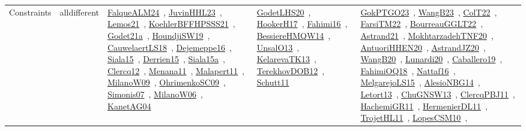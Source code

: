 {\begin{longtable}{lp{3cm}>{\raggedright\arraybackslash}p{6cm}>{\raggedright\arraybackslash}p{6cm}>{\raggedright\arraybackslash}p{8cm}}
Constraints & alldifferent & \href{../works/FalqueALM24.pdf}{FalqueALM24}~\cite{FalqueALM24}, \href{../works/JuvinHHL23.pdf}{JuvinHHL23}~\cite{JuvinHHL23}, \href{../works/Lemos21.pdf}{Lemos21}~\cite{Lemos21}, \href{../works/KoehlerBFFHPSSS21.pdf}{KoehlerBFFHPSSS21}~\cite{KoehlerBFFHPSSS21}, \href{../works/Godet21a.pdf}{Godet21a}~\cite{Godet21a}, \href{../works/HoundjiSW19.pdf}{HoundjiSW19}~\cite{HoundjiSW19}, \href{../works/CauwelaertLS18.pdf}{CauwelaertLS18}~\cite{CauwelaertLS18}, \href{../works/Dejemeppe16.pdf}{Dejemeppe16}~\cite{Dejemeppe16}, \href{../works/Siala15.pdf}{Siala15}~\cite{Siala15}, \href{../works/Derrien15.pdf}{Derrien15}~\cite{Derrien15}, \href{../works/Siala15a.pdf}{Siala15a}~\cite{Siala15a}, \href{../works/Clercq12.pdf}{Clercq12}~\cite{Clercq12}, \href{../works/Menana11.pdf}{Menana11}~\cite{Menana11}, \href{../works/Malapert11.pdf}{Malapert11}~\cite{Malapert11}, \href{../works/MilanoW09.pdf}{MilanoW09}~\cite{MilanoW09}, \href{../works/OhrimenkoSC09.pdf}{OhrimenkoSC09}~\cite{OhrimenkoSC09}, \href{../works/Simonis07.pdf}{Simonis07}~\cite{Simonis07}, \href{../works/MilanoW06.pdf}{MilanoW06}~\cite{MilanoW06}, \href{../works/KanetAG04.pdf}{KanetAG04}~\cite{KanetAG04} & \href{../works/GodetLHS20.pdf}{GodetLHS20}~\cite{GodetLHS20}, \href{../works/HookerH17.pdf}{HookerH17}~\cite{HookerH17}, \href{../works/Fahimi16.pdf}{Fahimi16}~\cite{Fahimi16}, \href{../works/BessiereHMQW14.pdf}{BessiereHMQW14}~\cite{BessiereHMQW14}, \href{../works/UnsalO13.pdf}{UnsalO13}~\cite{UnsalO13}, \href{../works/KelarevaTK13.pdf}{KelarevaTK13}~\cite{KelarevaTK13}, \href{../works/TerekhovDOB12.pdf}{TerekhovDOB12}~\cite{TerekhovDOB12}, \href{../works/Schutt11.pdf}{Schutt11}~\cite{Schutt11} & \href{../works/GokPTGO23.pdf}{GokPTGO23}~\cite{GokPTGO23}, \href{../works/WangB23.pdf}{WangB23}~\cite{WangB23}, \href{../works/ColT22.pdf}{ColT22}~\cite{ColT22}, \href{../works/FarsiTM22.pdf}{FarsiTM22}~\cite{FarsiTM22}, \href{../works/BourreauGGLT22.pdf}{BourreauGGLT22}~\cite{BourreauGGLT22}, \href{../works/Astrand21.pdf}{Astrand21}~\cite{Astrand21}, \href{../works/MokhtarzadehTNF20.pdf}{MokhtarzadehTNF20}~\cite{MokhtarzadehTNF20}, \href{../works/AntuoriHHEN20.pdf}{AntuoriHHEN20}~\cite{AntuoriHHEN20}, \href{../works/AstrandJZ20.pdf}{AstrandJZ20}~\cite{AstrandJZ20}, \href{../works/WangB20.pdf}{WangB20}~\cite{WangB20}, \href{../works/Lunardi20.pdf}{Lunardi20}~\cite{Lunardi20}, \href{../works/Caballero19.pdf}{Caballero19}~\cite{Caballero19}, \href{../works/FahimiOQ18.pdf}{FahimiOQ18}~\cite{FahimiOQ18}, \href{../works/Nattaf16.pdf}{Nattaf16}~\cite{Nattaf16}, \href{../works/MelgarejoLS15.pdf}{MelgarejoLS15}~\cite{MelgarejoLS15}, \href{../works/AlesioNBG14.pdf}{AlesioNBG14}~\cite{AlesioNBG14}, \href{../works/Letort13.pdf}{Letort13}~\cite{Letort13}, \href{../works/ChuGNSW13.pdf}{ChuGNSW13}~\cite{ChuGNSW13}, \href{../works/ClercqPBJ11.pdf}{ClercqPBJ11}~\cite{ClercqPBJ11}, \href{../works/HachemiGR11.pdf}{HachemiGR11}~\cite{HachemiGR11}, \href{../works/HermenierDL11.pdf}{HermenierDL11}~\cite{HermenierDL11}, \href{../works/TrojetHL11.pdf}{TrojetHL11}~\cite{TrojetHL11}, \href{../works/LopesCSM10.pdf}{LopesCSM10}~\cite{LopesCSM10}, 
\end{longtable}}

